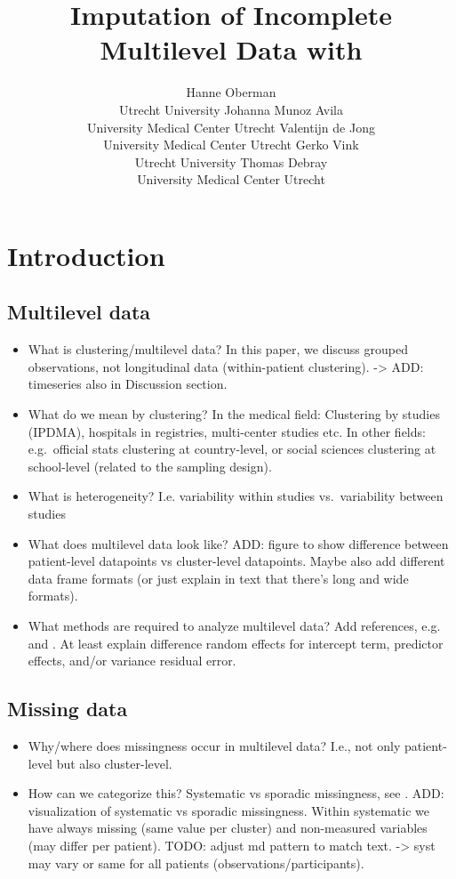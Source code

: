 \documentclass[
]{jss}
\author{
Hanne Oberman\\Utrecht University \And Johanna Munoz Avila\\University
Medical Center Utrecht \AND Valentijn de Jong\\University Medical
Center Utrecht \And Gerko Vink\\Utrecht University \AND Thomas
Debray\\University Medical Center Utrecht
}
\title{Imputation of Incomplete Multilevel Data with \pkg{mice}}
\begin{document}
\hypertarget{introduction}{%
\section{Introduction}\label{introduction}}

\hypertarget{multilevel-data}{%
\subsection{Multilevel data}\label{multilevel-data}}

\begin{itemize}
\item
  What is clustering/multilevel data? In this paper, we discuss grouped
  observations, not longitudinal data (within-patient clustering).
  -\textgreater{} ADD: timeseries also in Discussion section.
\item
  What do we mean by clustering? In the medical field: Clustering by
  studies (IPDMA), hospitals in registries, multi-center studies etc. In
  other fields: e.g.~official stats clustering at country-level, or
  social sciences clustering at school-level (related to the sampling
  design).
\item
  What is heterogeneity? I.e. variability within studies vs.~variability
  between studies
\item
  What does multilevel data look like? ADD: figure to show difference
  between patient-level datapoints vs cluster-level datapoints. Maybe
  also add different data frame formats (or just explain in text that
  there's long and wide formats).
\item
  What methods are required to analyze multilevel data? Add references,
  e.g. \citet{hox17} and \citet{jong21}. At least explain difference
  random effects for intercept term, predictor effects, and/or variance
  residual error.
\end{itemize}

\hypertarget{missing-data}{%
\subsection{Missing data}\label{missing-data}}

\begin{itemize}
\item
  Why/where does missingness occur in multilevel data? I.e., not only
  patient-level but also cluster-level.
\item
  How can we categorize this? Systematic vs sporadic missingness, see
  \citet{resc13}. ADD: visualization of systematic vs sporadic
  missingness. Within systematic we have always missing (same value per
  cluster) and non-measured variables (may differ per patient). TODO:
  adjust md pattern to match text. -\textgreater{} syst may vary or same
  for all patients (observations/participants).
\end{itemize}
\end{document}
